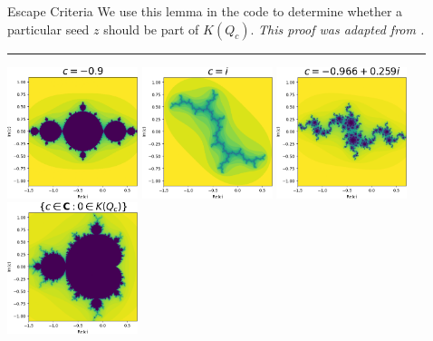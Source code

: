 \documentclass[final]{beamer}
\newlength{\sepwidth}
\newlength{\colwidth}
\newcommand{\separatorcolumn}{\begin{column}{\sepwidth}\end{column}}
\begin{document}
\begin{frame}[t]
\begin{columns}[t]
\begin{column}{\colwidth}
\begin{alertblock}{Escape Criteria}
		We use this lemma in the code to determine whether a particular
		seed $z$ should be part of $K(Q_c)$. \hfill \textit{\small This proof was adapted from \cite{ecsource}.}
	\end{alertblock}
	\hrule
	\nocite{*}
	\footnotesize{}

  \hfill
  \includegraphics[width=1.5in]{../figures/md9p0i-ticks-dark.png} \hfill
  \includegraphics[width=1.5in]{../figures/0p1i-ticks-dark.png} \hfill
  \includegraphics[width=1.5in]{../figures/md966pd259i-ticks-dark.png} \hfill
  \includegraphics[width=1.5in]{../figures/mandelbrot-ticks-dark.png} \hspace*{\fill}
\end{column}

\separatorcolumn

\begin{column}{\colwidth}


\end{column}
\end{columns}
\end{frame}
\end{document}
